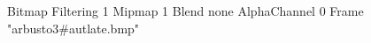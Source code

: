 {Bitmap
	{Filtering 1}
	{Mipmap 1}
	{Blend none}
	{AlphaChannel 0}
	{Frame "arbusto3#autlate.bmp"}
}
